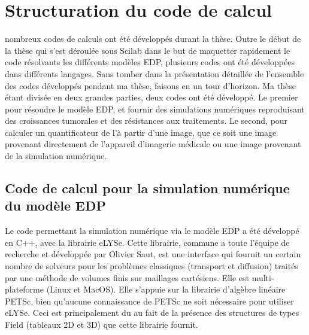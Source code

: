 \documentclass[main.tex]{subfiles}
\begin{document}
\chapter{Structuration du code de calcul \label{chap:structure_code} }
 nombreux codes de calculs ont été développés durant la thèse. Outre le début de la thèse qui s'est déroulée sous Scilab dans le but de maquetter rapidement le code résolvants les différents modèles EDP, plusieurs codes ont été développées dans différents langages. 
Sans tomber dans la présentation détaillée de l'ensemble des codes développés pendant ma thèse, faisons en un tour d'horizon. Ma thèse étant divisée en deux grandes parties, deux codes ont été développé. Le premier pour résoudre le modèle EDP, et fournir des simulations numériques reproduisant des croissances tumorales et des résistances aux traitements. Le second, pour calculer un quantificateur de l'\hetero à partir d'une image, que ce soit une image provenant directement de l'appareil d'imagerie médicale ou une image provenant de la simulation numérique.  

\section{Code de calcul pour la simulation numérique du modèle EDP}
Le code permettant la simulation numérique via le modèle EDP a été développé en C++, avec la librairie eLYSe. Cette librairie, commune a toute l'équipe de recherche et développée par Olivier Saut, est une interface qui fournit un certain nombre de solveurs pour les problèmes classiques (transport et diffusion) traités par une méthode de volumes finis sur maillages cartésiens. Elle est multi-plateforme (Linux et MacOS). 
Elle s'appuie sur la librairie d'algèbre linéaire PETSc, bien qu'aucune connaissance de PETSc ne soit nécessaire pour utiliser eLYSe. 
Ceci est principalement du au fait de la présence des structures de types Field (tableaux 2D et 3D) que cette librairie fournit. 
\end{document}
